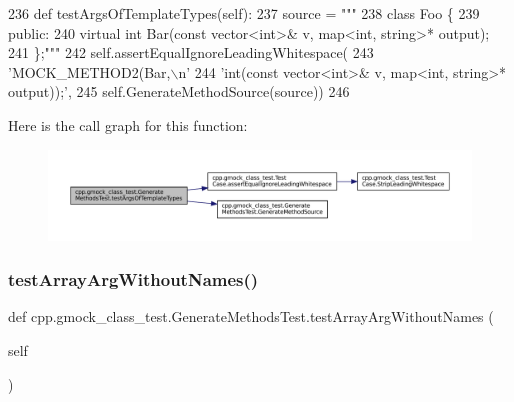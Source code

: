 \begin{DoxyCode}
236   \textcolor{keyword}{def }testArgsOfTemplateTypes(self):
237     source = \textcolor{stringliteral}{"""}
238 \textcolor{stringliteral}{class Foo \{}
239 \textcolor{stringliteral}{ public:}
240 \textcolor{stringliteral}{  virtual int Bar(const vector<int>& v, map<int, string>* output);}
241 \textcolor{stringliteral}{\};"""}
242     self.assertEqualIgnoreLeadingWhitespace(
243         \textcolor{stringliteral}{'MOCK\_METHOD2(Bar,\(\backslash\)n'}
244         \textcolor{stringliteral}{'int(const vector<int>& v, map<int, string>* output));'},
245         self.GenerateMethodSource(source))
246 
\end{DoxyCode}
Here is the call graph for this function\+:
\nopagebreak
\begin{figure}[H]
\begin{center}
\leavevmode
\includegraphics[width=350pt]{classcpp_1_1gmock__class__test_1_1GenerateMethodsTest_ade05313ccffe74f9eaa42fb66c14f702_cgraph}
\end{center}
\end{figure}
\mbox{\label{classcpp_1_1gmock__class__test_1_1GenerateMethodsTest_a544cd40e30b5dc3fbcf42385f0a54ad1}} 
\subsubsection{\texorpdfstring{test\+Array\+Arg\+Without\+Names()}{testArrayArgWithoutNames()}}
{\footnotesize\ttfamily def cpp.\+gmock\+\_\+class\+\_\+test.\+Generate\+Methods\+Test.\+test\+Array\+Arg\+Without\+Names (\begin{DoxyParamCaption}\item[{}]{self }\end{DoxyParamCaption})}



